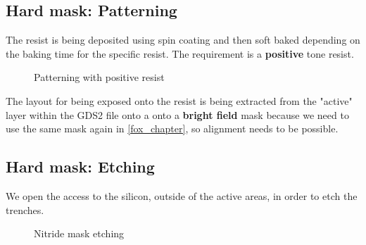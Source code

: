 \subsection{Hard mask: Patterning}

The resist is being deposited using spin coating and then soft baked depending on the baking time for the specific resist.
The requirement is a \textbf{positive} tone resist.

\begin{figure}[H]
	\centering
	\begin{tikzpicture}[node distance = 3cm, auto, thick,scale=\CrossSectionOnly, every node/.style={transform shape}]
		
	\end{tikzpicture}
	\begin{tikzpicture}[node distance = 3cm, auto, thick,scale=\CrossSectionOnly, every node/.style={transform shape}]
		
	\end{tikzpicture}
	\caption{Patterning with positive resist}
\end{figure}

The layout for being exposed onto the resist is being extracted from the "active" layer within the GDS2 file onto a  onto a \textbf{bright field} mask because we need to use the same mask again in \autoref{fox_chapter}, so alignment needs to be possible.

\newpage

\subsection{Hard mask: Etching}\label{sti_mask_etch}

We open the access to the silicon, outside of the active areas, in order to etch the trenches.

\begin{figure}[H]
	\centering
	\begin{tikzpicture}[node distance = 3cm, auto, thick,scale=\CrossSectionOnly, every node/.style={transform shape}]
		
	\end{tikzpicture}
	\drawStepArrow{}
	\begin{tikzpicture}[node distance = 3cm, auto, thick,scale=\CrossSectionOnly, every node/.style={transform shape}]
		
	\end{tikzpicture}
	\caption{Nitride mask etching}
\end{figure}

